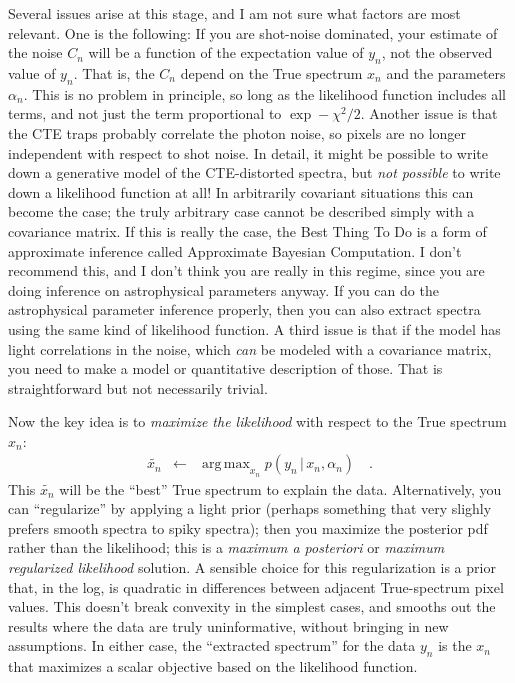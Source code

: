 \documentclass[11pt]{article}
\newcommand{\given}{\,|\,}
\newcommand{\best}[1]{\widetilde{#1}}
\DeclareMathOperator*{\argmax}{arg\,max}
\begin{document}
Several issues arise at this stage, and I am not sure what factors are
most relevant.
One is the following: If you are shot-noise dominated, your estimate
of the noise $C_n$ will be a function of the expectation value of
$y_n$, not the observed value of $y_n$.
That is, the $C_n$ depend on the True spectrum $x_n$ and the
parameters $\alpha_n$.
This is no problem in principle, so long as the likelihood function
includes all terms, and not just the term proportional to $\exp
-\chi^2/2$.
Another issue is that the CTE traps probably correlate the photon
noise, so pixels are no longer independent with respect to shot noise.
In detail, it might be possible to write down a generative model of
the CTE-distorted spectra, but \emph{not possible} to write down a
likelihood function at all!
In arbitrarily covariant situations this can become the case; the
truly arbitrary case cannot be described simply with a covariance
matrix.
If this is really the case, the Best Thing To Do is a form of
approximate inference called Approximate Bayesian Computation.
I don't recommend this, and I don't think you are really in this
regime, since you are doing inference on astrophysical parameters
anyway.
If you can do the astrophysical parameter inference properly, then you
can also extract spectra using the same kind of likelihood function.
A third issue is that if the model has light correlations in the
noise, which \emph{can} be modeled with a covariance matrix, you need
to make a model or quantitative description of those.
That is straightforward but not necessarily trivial.

Now the key idea is to \emph{maximize the likelihood} with respect to
the True spectrum $x_n$:
\begin{eqnarray}
\best{x_n} &\leftarrow& \argmax_{x_n} p(y_n\given x_n, \alpha_n)
\quad .
\end{eqnarray}
This $\best{x_n}$ will be the ``best'' True spectrum to explain the
data.
Alternatively, you can ``regularize'' by applying a light prior
(perhaps something that very slighly prefers smooth spectra to spiky
spectra); then you maximize the posterior pdf rather than the
likelihood; this is a \emph{maximum a posteriori} or \emph{maximum
  regularized likelihood} solution.
A sensible choice for this regularization is a prior that, in the log,
is quadratic in differences between adjacent True-spectrum pixel
values.  This doesn't break convexity in the simplest cases, and
smooths out the results where the data are truly uninformative,
without bringing in new assumptions.
In either case, the ``extracted spectrum'' for the data $y_n$ is the
$x_n$ that maximizes a scalar objective based on the likelihood
function.
\end{document}
